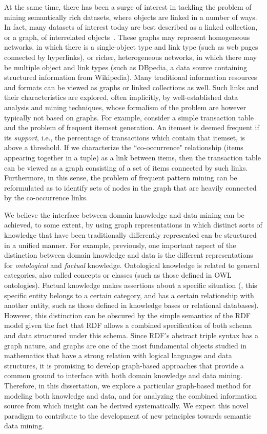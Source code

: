 At the same time, there has been a surge of interest in tackling the problem of mining semantically rich datasets, where objects are linked in a number of ways. In fact, many datasets of interest today are best described as a linked collection, or a graph, of interrelated objects~\cite{LinkMiningGetoor}. These graphs may represent homogeneous networks, in which there is a single-object type and link type (such as web pages connected by hyperlinks), or richer, heterogeneous networks, in which there may be multiple object and link types (such as DBpedia, a data source containing structured information from Wikipedia). Many traditional information resources and formats can be viewed as graphs or linked collections as well. Such links and their characteristics are explored, often implicitly, by well-established data analysis and mining techniques, whose formalism of the problem are however typically not based on graphs. For example, consider a simple transaction table and the problem of frequent itemset generation. An itemset is deemed frequent if its \emph{support}, i.e., the percentage of transactions which contain that itemset, is above a threshold. If we characterize the ``co-occurrence" relationship (items appearing together in a tuple) as a link between items, then the transaction table can be viewed as a graph consisting of a set of items connected by such links. Furthermore, in this sense, the problem of frequent pattern mining can be reformulated as to identify sets of nodes in the graph that are heavily connected by the co-occurrence links.

We believe the interface between domain knowledge and data mining can be achieved, to some extent, by using graph representations in which distinct sorts of knowledge that have been traditionally differently represented can be structured in a unified manner. For example, previously, one important aspect of the distinction between domain knowledge and data is the different representations for \emph{ontological} and \emph{factual} knowledge. Ontological knowledge is related to general categories, also called concepts or classes (such as those defined in OWL ontologies). Factual knowledge makes assertions about a specific situation (\eg, this specific entity belongs to a certain category, and has a certain relationship with another entity, such as those defined in knowledge bases or relational databases). However, this distinction can be obscured by the simple semantics of the RDF model given the fact that RDF allows a combined specification of both schema and data structured under this schema. Since RDF's abstract triple syntax has a graph nature, and graphs are one of the most fundamental objects studied in mathematics that have a strong relation with logical languages and data structures, it is promising to develop graph-based approaches that provide a common ground to interface with both domain knowledge and data mining. Therefore, in this dissertation, we explore a particular graph-based method for modeling both knowledge and data, and for analyzing the combined information source from which insight can be derived systematically. We expect this novel paradigm to contribute to the development of new principles towards semantic data mining.

